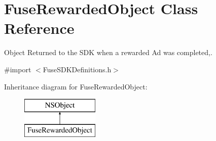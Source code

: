 \hypertarget{interface_fuse_rewarded_object}{}\section{Fuse\+Rewarded\+Object Class Reference}
\label{interface_fuse_rewarded_object}


Object Returned to the S\+D\+K when a rewarded Ad was completed,.  




{\ttfamily \#import $<$Fuse\+S\+D\+K\+Definitions.\+h$>$}

Inheritance diagram for Fuse\+Rewarded\+Object\+:\begin{figure}[H]
\begin{center}
\leavevmode
\includegraphics[height=2.000000cm]{interface_fuse_rewarded_object}
\end{center}
\end{figure}
